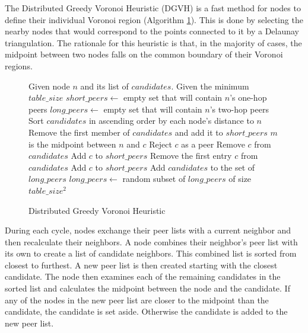 The Distributed Greedy Voronoi Heuristic (DGVH) is a fast method for nodes to define their individual Voronoi region (Algorithm \ref{alg:dgvh}). 
This is done by selecting the nearby nodes that would correspond to the points connected to it by a Delaunay triangulation.
The rationale for this heuristic is that, in the majority of cases, the midpoint between two nodes falls on the common boundary of their Voronoi regions.




\begin{figure} %
\caption{Distributed Greedy Voronoi Heuristic}
\label{alg:dgvh}
\begin{algorithmic}[1]  %
	 \State Given node $n$ and its list of $candidates$.
   	 \State Given the minimum $table\_size$
    \State $short\_peers \leftarrow$ empty set that will contain $n$'s one-hop peers
	 \State $long\_peers \leftarrow$ empty set that will contain $n$'s two-hop peers    
    \State Sort $candidates$ in ascending order by each node's distance to $n$
    \State Remove the first member of $candidates$ and add it to $short\_peers$
    	\State $m$ is the midpoint between $n$ and $c$
        	\State Reject $c$ as a peer
        \Else
        	\State Remove $c$ from $candidates$
        	\State Add $c$ to $short\_peers$
        \EndIf
    \EndFor
    	\State Remove the first entry $c$ from $candidates$
    	\State Add $c$ to $short\_peers$
    \EndWhile
    	\State Add $candidates$ to the set of $long\_peers$	
        		\State $long\_peers \leftarrow$ random subset of $long\_peers$ of size $table\_size^2$
      \EndIf
\end{algorithmic}
\end{figure}


During each cycle, nodes exchange their peer lists with a current neighbor and then recalculate their neighbors.  
A node combines their neighbor's peer list with its own to create a list of candidate neighbors.
This combined list is sorted from closest to furthest.
A new peer list is then created starting with the closest candidate.
The node then examines each of the remaining candidates in the sorted list and calculates the midpoint between the node and the candidate.
If any of the nodes in the new peer list are closer to the midpoint than the candidate, the candidate is set aside.  
Otherwise the candidate is added to the new peer list.







